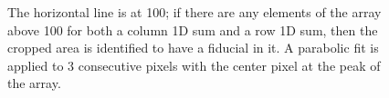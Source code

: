 \documentclass[10pt]{scrartcl}
\begin{document}
\begin{figure}[!ht]
\begin{subfigure}[b]{.3\linewidth}
    \end{subfigure}
    \caption{The horizontal line is at 100; if there are any elements of the array above 100 for both a column 1D sum and a row 1D sum, then the cropped area is identified to have a fiducial in it. A parabolic fit is applied to 3 consecutive pixels with the center pixel at the peak of the array.}
    \label{lotsofplot}
\end{figure}




\end{document}
